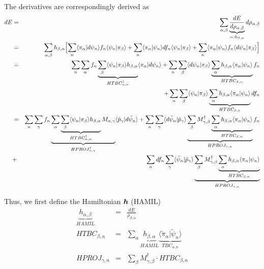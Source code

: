 \documentclass[11pt,a4paper]{report}
\begin{document}
The derivatives are correspondingly derived as 
\begin{eqnarray}
dE&=&\sum_{\alpha,\beta}\underbrace{\frac{dE}{d\rho_{\alpha,\beta}}}
_{=:h_{\beta,\alpha}}d\rho_{\alpha,\beta}
\nonumber\\
&=&\sum_{\alpha,\beta}h_{\beta,\alpha}
\Bigl[
\sum_n\langle\pi_\alpha|d\psi_n\rangle f_n\langle\psi_n|\pi_\beta\rangle
+\sum_n\langle\pi_\alpha|\psi_n\rangle df_n\langle\psi_n|\pi_\beta\rangle
+\sum_n\langle\pi_\alpha|\psi_n\rangle f_n\langle{d}\psi_n|\pi_\beta\rangle
\Bigr]
\nonumber\\
&=&\sum_n\sum_{\alpha}
f_n
\underbrace{\sum_{\beta}
\langle\psi_n|\pi_\beta\rangle h_{\beta,\alpha}}_{HTBC^\dagger_{n,\alpha}}
\langle\pi_\alpha|d\psi_n\rangle 
+
\sum_n\sum_{\beta}
\langle{d}\psi_n|\pi_\beta\rangle 
\underbrace{\sum_{\alpha}h_{\beta,\alpha} \langle\pi_\alpha|\psi_n\rangle}_{HTBC_{\beta,n}} f_n
\nonumber\\
&&+
\sum_n\sum_{\beta}
\langle\psi_n|\pi_\beta\rangle 
\underbrace{\sum_{\alpha}h_{\beta,\alpha} \langle\pi_\alpha|\psi_n\rangle}_{HTBC_{\beta,n}} df_n
\nonumber\\
&=&\sum_n\sum_{\gamma}
f_n
\underbrace{\sum_{\alpha}
\underbrace{\sum_{\beta}
\langle\psi_n|\pi_\beta\rangle h_{\beta,\alpha}}_{HTBC^\dagger_{n,\alpha}}
M_{\alpha,\gamma}}_{HPROJ^\dagger_{n,\gamma}}
\langle\tilde{p}_\gamma|d\tilde{\psi}_n\rangle 
+
\sum_n\sum_{\gamma}
\langle{d}\tilde{\psi}_n|\tilde{p}_\gamma\rangle 
\underbrace{
\sum_{\beta}M^\dagger_{\gamma,\beta}
\underbrace{\sum_{\alpha}h_{\beta,\alpha} \langle\pi_\alpha|\psi_n\rangle}_{HTBC_{\beta,n}}}_{HPROJ_{\gamma,n}} f_n
\nonumber\\
&+&
\sum_ndf_n\sum_{\gamma}
\langle\tilde{\psi}_n|\tilde{p}_\gamma\rangle 
\underbrace{
\sum_{\beta}M^\dagger_{\gamma,\beta}
\underbrace{\sum_{\alpha}h_{\beta,\alpha} \langle\pi_\alpha|\psi_n\rangle}_{HTBC_{\beta,n}}}_{HPROJ_{\gamma,n}} 
\end{eqnarray}

Thus, we first define the Hamiltonian $\bm{h}$ (HAMIL) 
\begin{eqnarray}
\underbrace{h_{\alpha,\beta}}_{HAMIL}&=&\frac{dE}{\rho_{\beta,\alpha}}
\nonumber\\
HTBC_{\beta,n}&=&
\sum_\alpha \underbrace{h_{\beta,\alpha}}_{HAMIL}
\underbrace{\langle\tilde{\pi}_\alpha|\tilde{\psi}_n\rangle}_{TBC_{\alpha,n}}
\nonumber\\
HPROJ_{\gamma,n}&=&\sum_\beta M^\dagger_{\gamma,\beta}\cdot HTBC_{\beta,n}
\end{eqnarray}
\end{document}
